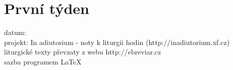 \documentclass[12pt, twoside, a4paper]{article}
\newcommand{\cervene}[1]{%
  \textcolor{BrickRed}{#1}}
\newcommand{\nadpisTyden}[1]{%
  {\textsc{\Large \cervene{#1}}}}
\begin{document}
\section{První týden}

  

datum: \currenttime \\
projekt: In adiutorium - noty k liturgii hodin (http://inadiutorium.xf.cz)\\
liturgické texty převzaty z webu http://ebreviar.cz\\
sazba programem \LaTeX
\end{document}
